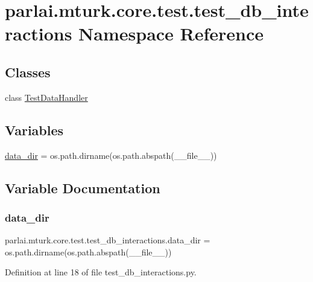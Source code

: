 \hypertarget{namespaceparlai_1_1mturk_1_1core_1_1test_1_1test__db__interactions}{}\section{parlai.\+mturk.\+core.\+test.\+test\+\_\+db\+\_\+interactions Namespace Reference}
\label{namespaceparlai_1_1mturk_1_1core_1_1test_1_1test__db__interactions}
\subsection*{Classes}
\begin{DoxyCompactItemize}
\item 
class \hyperlink{classparlai_1_1mturk_1_1core_1_1test_1_1test__db__interactions_1_1TestDataHandler}{Test\+Data\+Handler}
\end{DoxyCompactItemize}
\subsection*{Variables}
\begin{DoxyCompactItemize}
\item 
\hyperlink{namespaceparlai_1_1mturk_1_1core_1_1test_1_1test__db__interactions_a033da2ef81c936c9d2864de258bacca9}{data\+\_\+dir} = os.\+path.\+dirname(os.\+path.\+abspath(\+\_\+\+\_\+file\+\_\+\+\_\+))
\end{DoxyCompactItemize}


\subsection{Variable Documentation}
\mbox{\label{namespaceparlai_1_1mturk_1_1core_1_1test_1_1test__db__interactions_a033da2ef81c936c9d2864de258bacca9}} 
\subsubsection{\texorpdfstring{data\+\_\+dir}{data\_dir}}
{\footnotesize\ttfamily parlai.\+mturk.\+core.\+test.\+test\+\_\+db\+\_\+interactions.\+data\+\_\+dir = os.\+path.\+dirname(os.\+path.\+abspath(\+\_\+\+\_\+file\+\_\+\+\_\+))}



Definition at line 18 of file test\+\_\+db\+\_\+interactions.\+py.

